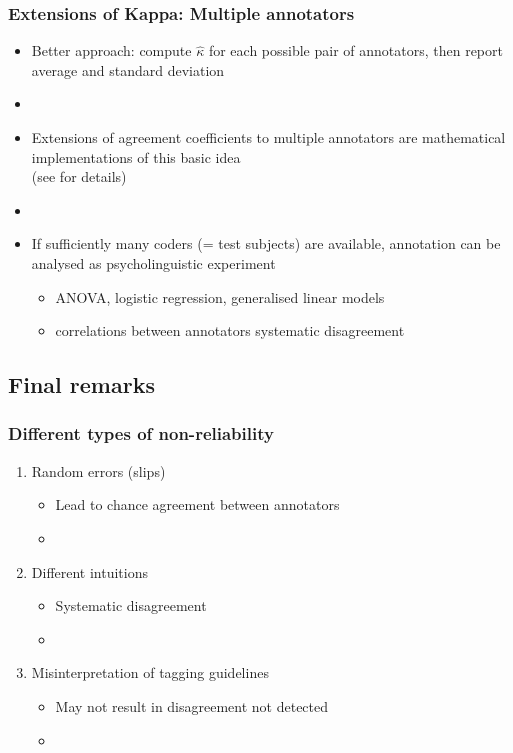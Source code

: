 \documentclass[t]{beamer} %
\begin{document}
\begin{frame}
  \frametitle{Extensions of Kappa: Multiple annotators}
  
  \begin{itemize}
  \item Better approach: compute $\hat{\kappa}$ for each possible pair of
    annotators, then report average and standard deviation
  \item[]\pause
  \item Extensions of agreement coefficients to multiple annotators are
    mathematical implementations of this basic idea\\
    (see \citealt{Artstein:Poesio:08} for details)
  \item[]\pause
  \item If sufficiently many coders (= test subjects) are available,
    annotation can be analysed as psycholinguistic experiment
    \begin{itemize}
    \item ANOVA, logistic regression, generalised linear models
    \item correlations between annotators \so systematic disagreement
    \end{itemize}
  \end{itemize}
\end{frame}

\subsection{Final remarks}

\begin{frame}
  \frametitle{Different types of non-reliability}

  \begin{enumerate}
  \item<1-> Random errors (slips)
    \begin{itemize}
    \item Lead to chance agreement between annotators
    \item[]
    \end{itemize}
  \item<2-> Different intuitions
    \begin{itemize}
    \item Systematic disagreement
    \item[]
    \end{itemize}
  \item<3-> Misinterpretation of tagging guidelines
    \begin{itemize}
    \item May not result in disagreement \so not detected
    \item[]
    \end{itemize}
  \end{enumerate}
\end{frame}
\end{document}
